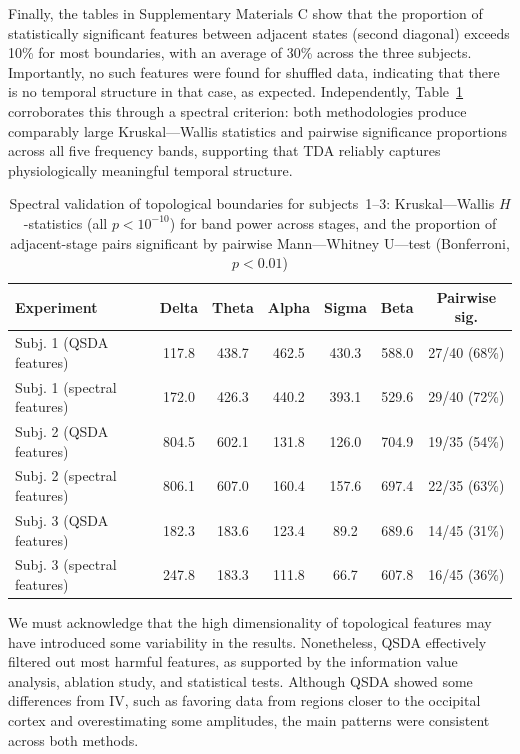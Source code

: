 \documentclass[pdflatex,sn-basic,Numbered]{sn-jnl}
\begin{document}
Finally, the tables in Supplementary Materials C show that the proportion of statistically significant features between adjacent states (second diagonal) exceeds 10\% for most boundaries, with an average of 30\% across the three subjects. Importantly, no such features were found for shuffled data, indicating that there is no temporal structure in that case, as expected. Independently, Table~\ref{table1} corroborates this through a spectral criterion: both methodologies produce comparably large Kruskal---Wallis statistics and pairwise significance proportions across all five frequency bands, supporting that TDA reliably captures physiologically meaningful temporal structure.

\begin{table}
\centering
\caption{Spectral validation of topological boundaries for subjects~1--3: Kruskal---Wallis $H$-statistics (all $p < 10^{-10}$) for band power across stages, and the proportion of adjacent-stage pairs significant by pairwise Mann---Whitney U---test (Bonferroni, $p < 0.01$)}\label{table1}
\begin{tabular}{lcccccc}
  \toprule
  Experiment & Delta & Theta & Alpha & Sigma & Beta & Pairwise sig. \\
  \midrule
  Subj. 1 (QSDA features)     & 117.8 & 438.7 & 462.5 & 430.3 & 588.0 & 27/40 (68\%) \\
  Subj. 1 (spectral features) & 172.0 & 426.3 & 440.2 & 393.1 & 529.6 & 29/40 (72\%) \\
  \addlinespace
  Subj. 2 (QSDA features)     & 804.5 & 602.1 & 131.8 & 126.0 & 704.9 & 19/35 (54\%) \\
  Subj. 2 (spectral features) & 806.1 & 607.0 & 160.4 & 157.6 & 697.4 & 22/35 (63\%) \\
  \addlinespace
  Subj. 3 (QSDA features)     & 182.3 & 183.6 & 123.4 & 89.2 & 689.6 & 14/45 (31\%) \\
  Subj. 3 (spectral features) & 247.8 & 183.3 & 111.8 & 66.7 & 607.8 & 16/45 (36\%) \\
  \bottomrule
\end{tabular}
\end{table}

We must acknowledge that the high dimensionality of topological features may have introduced some variability in the results. Nonetheless, QSDA effectively filtered out most harmful features, as supported by the information value analysis, ablation study, and statistical tests. Although QSDA showed some differences from IV, such as favoring data from regions closer to the occipital cortex and overestimating some amplitudes, the main patterns were consistent across both methods.
\end{document}
